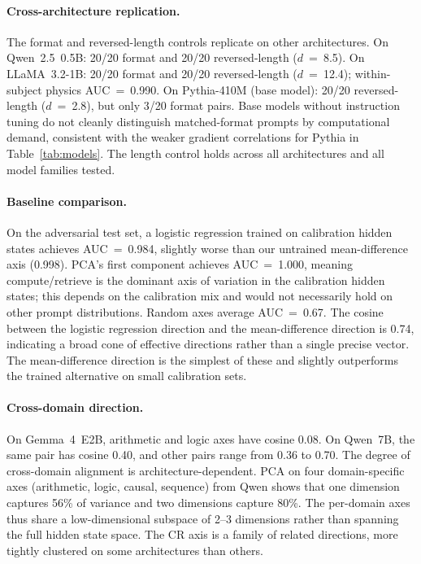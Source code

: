 \documentclass[11pt]{article}
\begin{document}
\paragraph{Cross-architecture replication.} The format and reversed-length controls replicate on other architectures. On Qwen~2.5~0.5B: 20/20 format and 20/20 reversed-length ($d$~=~8.5). On LLaMA~3.2-1B: 20/20 format and 20/20 reversed-length ($d$~=~12.4); within-subject physics AUC~=~0.990. On Pythia-410M (base model): 20/20 reversed-length ($d$~=~2.8), but only 3/20 format pairs. Base models without instruction tuning do not cleanly distinguish matched-format prompts by computational demand, consistent with the weaker gradient correlations for Pythia in Table~\ref{tab:models}. The length control holds across all architectures and all model families tested.

\paragraph{Baseline comparison.} On the adversarial test set, a logistic regression trained on calibration hidden states achieves AUC~=~0.984, slightly worse than our untrained mean-difference axis (0.998). PCA's first component achieves AUC~=~1.000, meaning compute/retrieve is the dominant axis of variation in the calibration hidden states; this depends on the calibration mix and would not necessarily hold on other prompt distributions. Random axes average AUC~=~0.67. The cosine between the logistic regression direction and the mean-difference direction is 0.74, indicating a broad cone of effective directions rather than a single precise vector. The mean-difference direction is the simplest of these and slightly outperforms the trained alternative on small calibration sets.

\paragraph{Cross-domain direction.} On Gemma~4~E2B, arithmetic and logic axes have cosine 0.08. On Qwen~7B, the same pair has cosine 0.40, and other pairs range from 0.36 to 0.70. The degree of cross-domain alignment is architecture-dependent. PCA on four domain-specific axes (arithmetic, logic, causal, sequence) from Qwen shows that one dimension captures 56\% of variance and two dimensions capture 80\%. The per-domain axes thus share a low-dimensional subspace of 2--3 dimensions rather than spanning the full hidden state space. The CR axis is a family of related directions, more tightly clustered on some architectures than others.
\end{document}

